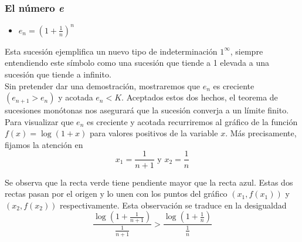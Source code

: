 \documentclass[../Teoría.root.tex]{subfiles}
\begin{document}
\subsubsection{El número \textit{e}}
\begin{itemize}
    \item \(e_n=\left(1+\frac{1}{n}\right)^n\)
\end{itemize}
Esta sucesión ejemplifica un nuevo tipo de indeterminación \(1^\infty\), siempre entendiendo este símbolo como una sucesión que tiende a 1 elevada a una sucesión que tiende a infinito.\\
Sin pretender dar una demostración, mostraremos que \(e_n\) es creciente \((e_{n+1}>e_n)\) y acotada \(e_n<K\).
Aceptados estos dos hechos, el teorema de sucesiones monótonas nos asegurará que la sucesión converja a un límite finito.\\
Para visualizar que \(e_n\) es creciente y acotada recurriremos al gráfico de la función \(f(x)=\log(1+x)\) para valores positivos de la variable \(x\).
Más precisamente, fijamos la atención en \[x_1=\frac{1}{n+1}\text{ y }x_2=\frac{1}{n}\]
\begin{center}
    \begin{scaletikzpicturetowidth}{\linewidth}
    \end{scaletikzpicturetowidth}
\end{center}
Se observa que la recta verde tiene pendiente mayor que la recta azul.
Estas dos rectas pasan por el origen y lo unen con los puntos del gráfico \((x_1,f(x_1))\) y \((x_2,f(x_2))\) respectivamente.
Esta observación se traduce en la desigualdad
\[\frac{\log\left(1+\frac{1}{n+1}\right)}{\frac{1}{n+1}}>\frac{\log\left(1+\frac{1}{n}\right)}{\frac{1}{n}}\]
\end{document}
